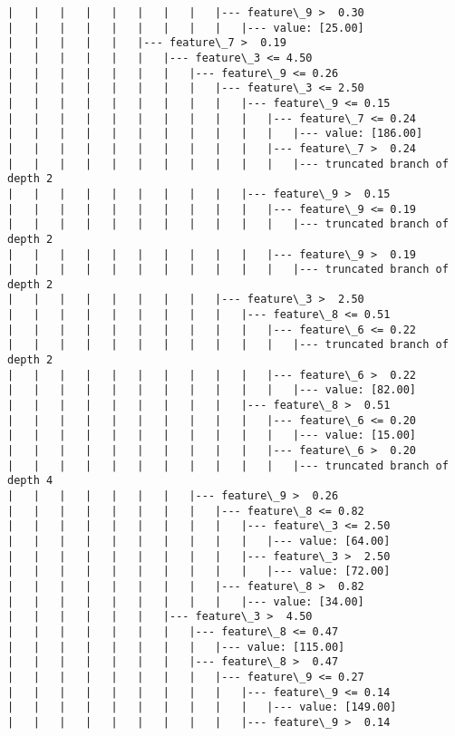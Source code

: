 \documentclass[11pt]{article}
\begin{document}
\begin{Verbatim}[commandchars=\\\{\}]
|   |   |   |   |   |   |   |   |--- feature\_9 >  0.30
|   |   |   |   |   |   |   |   |   |--- value: [25.00]
|   |   |   |   |   |--- feature\_7 >  0.19
|   |   |   |   |   |   |--- feature\_3 <= 4.50
|   |   |   |   |   |   |   |--- feature\_9 <= 0.26
|   |   |   |   |   |   |   |   |--- feature\_3 <= 2.50
|   |   |   |   |   |   |   |   |   |--- feature\_9 <= 0.15
|   |   |   |   |   |   |   |   |   |   |--- feature\_7 <= 0.24
|   |   |   |   |   |   |   |   |   |   |   |--- value: [186.00]
|   |   |   |   |   |   |   |   |   |   |--- feature\_7 >  0.24
|   |   |   |   |   |   |   |   |   |   |   |--- truncated branch of depth 2
|   |   |   |   |   |   |   |   |   |--- feature\_9 >  0.15
|   |   |   |   |   |   |   |   |   |   |--- feature\_9 <= 0.19
|   |   |   |   |   |   |   |   |   |   |   |--- truncated branch of depth 2
|   |   |   |   |   |   |   |   |   |   |--- feature\_9 >  0.19
|   |   |   |   |   |   |   |   |   |   |   |--- truncated branch of depth 2
|   |   |   |   |   |   |   |   |--- feature\_3 >  2.50
|   |   |   |   |   |   |   |   |   |--- feature\_8 <= 0.51
|   |   |   |   |   |   |   |   |   |   |--- feature\_6 <= 0.22
|   |   |   |   |   |   |   |   |   |   |   |--- truncated branch of depth 2
|   |   |   |   |   |   |   |   |   |   |--- feature\_6 >  0.22
|   |   |   |   |   |   |   |   |   |   |   |--- value: [82.00]
|   |   |   |   |   |   |   |   |   |--- feature\_8 >  0.51
|   |   |   |   |   |   |   |   |   |   |--- feature\_6 <= 0.20
|   |   |   |   |   |   |   |   |   |   |   |--- value: [15.00]
|   |   |   |   |   |   |   |   |   |   |--- feature\_6 >  0.20
|   |   |   |   |   |   |   |   |   |   |   |--- truncated branch of depth 4
|   |   |   |   |   |   |   |--- feature\_9 >  0.26
|   |   |   |   |   |   |   |   |--- feature\_8 <= 0.82
|   |   |   |   |   |   |   |   |   |--- feature\_3 <= 2.50
|   |   |   |   |   |   |   |   |   |   |--- value: [64.00]
|   |   |   |   |   |   |   |   |   |--- feature\_3 >  2.50
|   |   |   |   |   |   |   |   |   |   |--- value: [72.00]
|   |   |   |   |   |   |   |   |--- feature\_8 >  0.82
|   |   |   |   |   |   |   |   |   |--- value: [34.00]
|   |   |   |   |   |   |--- feature\_3 >  4.50
|   |   |   |   |   |   |   |--- feature\_8 <= 0.47
|   |   |   |   |   |   |   |   |--- value: [115.00]
|   |   |   |   |   |   |   |--- feature\_8 >  0.47
|   |   |   |   |   |   |   |   |--- feature\_9 <= 0.27
|   |   |   |   |   |   |   |   |   |--- feature\_9 <= 0.14
|   |   |   |   |   |   |   |   |   |   |--- value: [149.00]
|   |   |   |   |   |   |   |   |   |--- feature\_9 >  0.14

\end{Verbatim}
\end{document}

